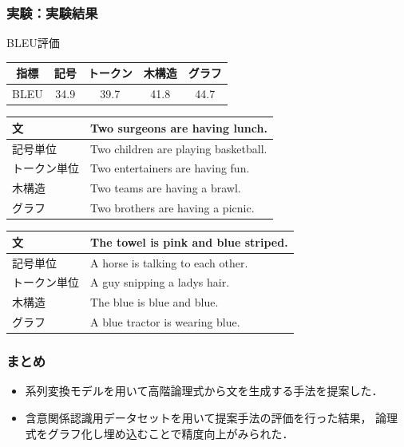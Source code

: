 \documentclass[dvipdfmx,cjk]{beamer}
\begin{document}
\begin{frame}
\frametitle{実験：実験結果}
\begin{block}{BLEU評価}
  \label{table:evaluation}
  \centering
  \begin{tabular}{ccccc}
    \hline
    指標  & 記号 & トークン & 木構造 & グラフ \\
    \hline \hline
    BLEU  & 34.9   & 39.7 & 41.8  & 44.7\\
    \hline
  \end{tabular}
\label{sec:result}
\end{block}
\begin{table}[h]
\centering
\begin{tabular}{ll} \hline
文 & Two surgeons are having lunch. \\ \hline
記号単位 & Two children are playing basketball.\\
トークン単位 & Two entertainers are having fun.\\
木構造 & Two teams are having a brawl.\\
グラフ & Two brothers are having a picnic.\\ \hline
\end{tabular}
\label{tab:example1}
\end{table}
\begin{table}[h]
\centering
\begin{tabular}{ll} \hline
文 & The towel is pink and blue striped. \\ \hline
記号単位 & A horse is talking to each other.\\
トークン単位 & A guy snipping a ladys hair.\\
木構造 & The blue is blue and blue.\\
グラフ & A blue tractor is wearing blue.\\ \hline
\end{tabular}
\label{tab:example2}
\end{table}
\end{frame}

\begin{frame}
\frametitle{まとめ}
\begin{itemize}
\item 系列変換モデルを用いて高階論理式から文を生成する手法を提案した．
\item 含意関係認識用データセットを用いて提案手法の評価を行った結果，
論理式をグラフ化し埋め込むことで精度向上がみられた．
\end{itemize}

\end{frame}
\end{document}
